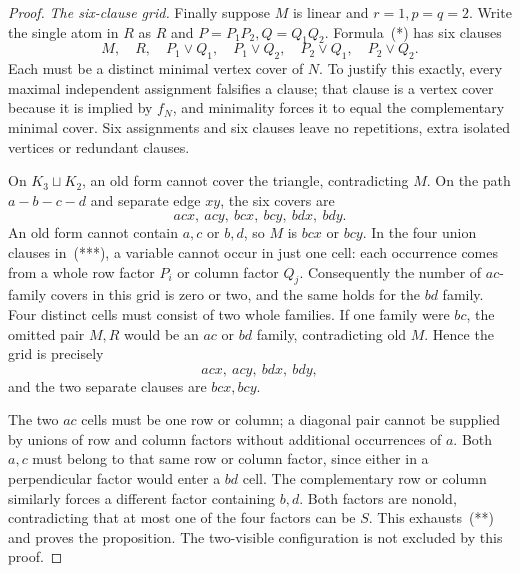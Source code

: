 \documentclass[11pt]{article}
\theoremstyle{definition}
\theoremstyle{remark}
\begin{document}
\begin{proof}
\emph{The six-clause grid.} Finally suppose $M$ is linear and $r=1,p=q=2$. Write the single atom in $R$ as $R$ and $P=P_1P_2,Q=Q_1Q_2$. Formula~(*) has six clauses
\[
 M,\quad R,\quad P_1\vee Q_1,\quad P_1\vee Q_2,
       \quad P_2\vee Q_1,\quad P_2\vee Q_2.                      \tag{***}
\]
Each must be a distinct minimal vertex cover of $N$. To justify this exactly, every maximal independent assignment falsifies a clause; that clause is a vertex cover because it is implied by $f_N$, and minimality forces it to equal the complementary minimal cover. Six assignments and six clauses leave no repetitions, extra isolated vertices or redundant clauses.

On $K_3\sqcup K_2$, an old form cannot cover the triangle, contradicting $M$. On the path $a-b-c-d$ and separate edge $xy$, the six covers are
\[
 acx,\ acy,\ bcx,\ bcy,\ bdx,\ bdy.
\]
An old form cannot contain $a,c$ or $b,d$, so $M$ is $bcx$ or $bcy$. In the four union clauses in~(***), a variable cannot occur in just one cell: each occurrence comes from a whole row factor $P_i$ or column factor $Q_j$. Consequently the number of $ac$-family covers in this grid is zero or two, and the same holds for the $bd$ family. Four distinct cells must consist of two whole families. If one family were $bc$, the omitted pair $M,R$ would be an $ac$ or $bd$ family, contradicting old $M$. Hence the grid is precisely
\[
 acx,\ acy,\ bdx,\ bdy,
\]
and the two separate clauses are $bcx,bcy$.

The two $ac$ cells must be one row or column; a diagonal pair cannot be supplied by unions of row and column factors without additional occurrences of $a$. Both $a,c$ must belong to that same row or column factor, since either in a perpendicular factor would enter a $bd$ cell. The complementary row or column similarly forces a different factor containing $b,d$. Both factors are nonold, contradicting that at most one of the four factors can be $S$. This exhausts~(**) and proves the proposition. The two-visible configuration is not excluded by this proof.
\end{proof}
\end{document}
